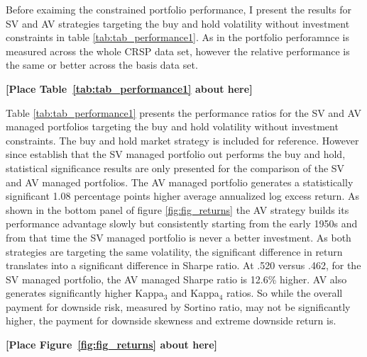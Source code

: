 Before exaiming the constrained portfolio performance, I present the results for SV and AV strategies targeting the buy and hold volatility without investment constraints in table \ref{tab:tab_performance1}. As in \citet{moreira_volatility-managed_2017} the portfolio perforamnce is measured across the whole CRSP data set, however the relative performance is the same or better across the basis data set. 

\bigskip
\centerline{\bf [Place Table~\ref{tab:tab_performance1} about here]}
\bigskip

Table \ref{tab:tab_performance1} presents the performance ratios for the SV and AV managed portfolios targeting the buy and hold volatility without investment constraints. The buy and hold market strategy is included for reference. However since \citet{moreira_volatility-managed_2017} establish that the SV managed portfolio out performs the buy and hold, statistical significance results are only presented for the comparison of the SV and AV managed portfolios. The AV managed portfolio generates a statistically significant 1.08 percentage points higher average annualized log excess return. As shown in the bottom panel of figure \ref{fig:fig_returns} the AV strategy builds its performance advantage slowly but consistently starting from the early 1950s and from that time the SV managed portfolio is never a better investment. As both strategies are targeting the same volatility, the significant difference in return translates into a significant difference in Sharpe ratio. At .520 versus .462, for the SV managed portfolio, the AV managed Sharpe ratio is 12.6\% higher. AV also generates significantly higher Kappa$_{3}$ and Kappa$_{4}$ ratios. So while the overall payment for downside risk, measured by Sortino ratio, may not be significantly higher, the payment for downside skewness and extreme downside return is. %

\bigskip
\centerline{\bf [Place Figure~\ref{fig:fig_returns} about here]}
\bigskip

